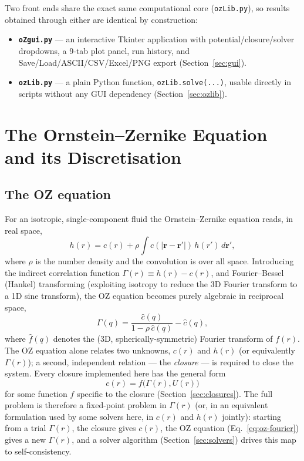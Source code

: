 \documentclass[11pt,a4paper]{article}
\newcommand{\code}[1]{\texttt{#1}}
\begin{document}
Two front ends share the exact same computational core (\code{ozLib.py}), so
results obtained through either are identical by construction:
\begin{itemize}[nosep]
  \item \textbf{\code{oZgui.py}} --- an interactive Tkinter application with
        potential/closure/solver dropdowns, a 9-tab plot panel, run history,
        and Save/Load/ASCII/CSV/Excel/PNG export (Section~\ref{sec:gui}).
  \item \textbf{\code{ozLib.py}} --- a plain Python function,
        \code{ozLib.solve(...)}, usable directly in scripts without any GUI
        dependency (Section~\ref{sec:ozlib}).
\end{itemize}

\section{The Ornstein--Zernike Equation and its Discretisation}
\label{sec:theory}

\subsection{The OZ equation}

For an isotropic, single-component fluid the Ornstein--Zernike equation reads,
in real space,
\begin{equation}
  h(r) = c(r) + \rho \int c(|\mathbf{r}-\mathbf{r}'|)\, h(r')\, d\mathbf{r}',
\end{equation}
where $\rho$ is the number density and the convolution is over all space.
Introducing the indirect correlation function $\Gamma(r) \equiv h(r)-c(r)$, and
Fourier--Bessel (Hankel) transforming (exploiting isotropy to reduce the 3D
Fourier transform to a 1D sine transform), the OZ equation becomes purely
algebraic in reciprocal space,
\begin{equation}
  \hat\Gamma(q) = \frac{\hat c(q)}{1-\rho\,\hat c(q)} - \hat c(q),
  \label{eq:oz-fourier}
\end{equation}
where $\hat f(q)$ denotes the (3D, spherically-symmetric) Fourier transform of
$f(r)$. The OZ equation alone relates two unknowns, $c(r)$ and $h(r)$ (or
equivalently $\Gamma(r)$); a second, independent relation --- the
\emph{closure} --- is required to close the system. Every closure implemented
here has the general form
\begin{equation}
  c(r) = f\big(\Gamma(r), U(r)\big)
\end{equation}
for some function $f$ specific to the closure (Section~\ref{sec:closures}). The
full problem is therefore a fixed-point problem in $\Gamma(r)$ (or, in an
equivalent formulation used by some solvers here, in $c(r)$ and $h(r)$
jointly): starting from a trial $\Gamma(r)$, the closure gives $c(r)$, the OZ
equation (Eq.~\ref{eq:oz-fourier}) gives a new $\Gamma(r)$, and a solver
algorithm (Section~\ref{sec:solvers}) drives this map to self-consistency.
\end{document}
